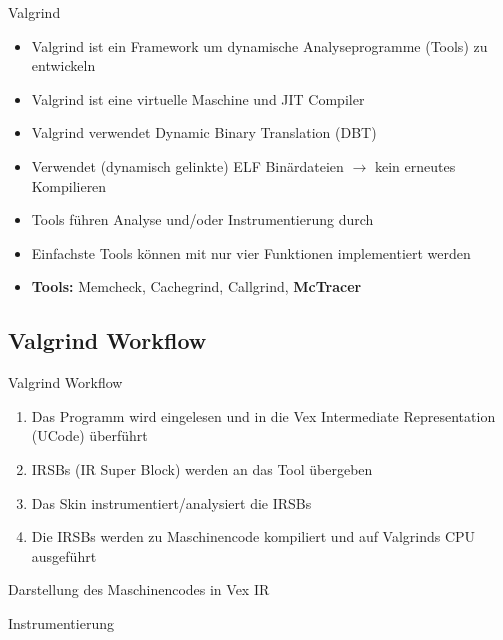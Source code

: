 \begin{frame}{Valgrind}
	\begin{itemize}
		\item Valgrind ist ein Framework um dynamische Analyseprogramme (Tools) zu entwickeln
		\pause \item Valgrind ist eine virtuelle Maschine und JIT Compiler
		\pause \item Valgrind verwendet Dynamic Binary Translation (DBT)
        \pause \item Verwendet (dynamisch gelinkte) ELF Binärdateien $\rightarrow$ kein erneutes Kompilieren
		\pause \item Tools führen Analyse und/oder Instrumentierung durch
		\pause \item Einfachste Tools können mit nur vier Funktionen implementiert werden
		\pause \item{\bf Tools:} Memcheck, Cachegrind, Callgrind, {\bf McTracer} 
	\end{itemize}
\end{frame}

\subsection{Valgrind Workflow}

\begin{frame}{Valgrind Workflow}
	\begin{enumerate}
		\item Das Programm wird eingelesen und in die Vex Intermediate Representation (UCode) überführt
		\pause \item IRSBs (IR Super Block) werden an das Tool übergeben 
		\pause \item Das Skin instrumentiert/analysiert die IRSBs
		\pause \item Die IRSBs werden zu Maschinencode kompiliert und auf Valgrinds CPU ausgeführt
	\end{enumerate}
\end{frame}

\begin{frame}{Darstellung des Maschinencodes in Vex IR}
	\lstset{frame=single}
	
\end{frame}

\begin{frame}{Instrumentierung}
	\lstset{frame=single}
		
\end{frame}

